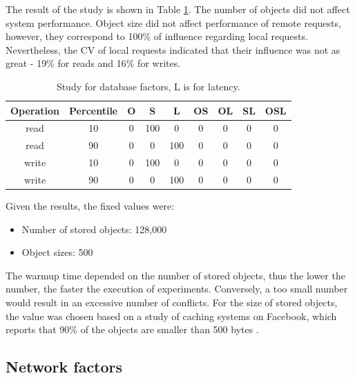 \documentclass[doublespacing]{bmcart}
\begin{document}
The result of the study is shown in Table
\ref{tab:estudo_para_fatores_de_banco_de_dados}. The number of objects did not
affect system performance. Object size did not affect performance of remote
requests, however, they correspond to 100\% of influence regarding local
requests. Nevertheless, the CV of local requests indicated that their influence
was not as great - 19\% for reads and 16\% for writes.

\begin{table}[h!]
\caption{Study for database factors, L is for latency.}
\begin{tabular}{ccccccccc} \hline

Operation & Percentile & O & S & L & OS & OL & SL & OSL\\\hline

read & 10 & 0 & 100 & 0 & 0 & 0 & 0 & 0 \\

read & 90 & 0 & 0 & 100 & 0 & 0 & 0 & 0 \\

write & 10 & 0 & 100 & 0 & 0 & 0 & 0 & 0 \\

write & 90 & 0 & 0 & 100 & 0 & 0 & 0 & 0 \\\hline

\end{tabular}
\label{tab:estudo_para_fatores_de_banco_de_dados} \end{table}

Given the results, the fixed values were:

\begin{itemize}

\item Number of stored objects: 128,000

\item Object sizes: 500

\end{itemize}

The warmup time depended on the number of stored objects, thus the lower the
number, the faster the execution of experiments.  Conversely, a too small number
would result in an excessive number of conflicts.  For the size of stored
objects, the value was chosen based on a study of caching systems on Facebook,
which reports that 90\% of the objects are smaller than 500 bytes
\cite{Atikoglu2012}.

\subsection{Network factors}
\end{document}
